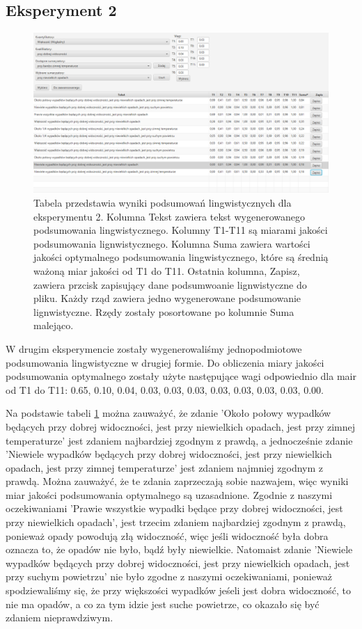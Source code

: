 \documentclass{classrep}
\begin{document}
\newpage
\subsection{Eksperyment 2}
\label{section:ex2}
\begin{figure}[h!]
 \centering
 \includegraphics[width=15cm]{ex2.png}
 \vspace{-0.3cm}
 \caption{Tabela przedstawia wyniki podsumowań lingwistycznych dla eksperymentu 2. Kolumna Tekst zawiera tekst wygenerowanego podsumowania lingwistycznego. Kolumny T1-T11 są miarami jakości podsumowania lignwistycznego\cite{niewiadomski19}. Kolumna Suma zawiera wartości jakości optymalnego podsumowania lingwistycznego, które są średnią ważoną miar jakości od T1 do T11. Ostatnia kolumna, Zapisz, zawiera przcisk zapisujący dane podsumwoanie lignwistyczne do pliku. Każdy rząd zawiera jedno wygenerowane podsumowanie lignwistyczne. Rzędy zostały posortowane po kolumnie Suma malejąco.  }
 \label{ex2}
\end{figure}

W drugim eksperymencie zostały wygenerowaliśmy jednopodmiotowe podsumowania lingwistyczne w drugiej formie. Do obliczenia miary jakości podsumowania optymalnego zostały użyte następujące wagi odpowiednio dla mair od T1 do T11: 0.65, 0.10, 0.04, 0.03, 0.03, 0.03, 0.03, 0.03, 0.03, 0.03, 0.00. 

Na podstawie tabeli \ref{ex2} można zauważyć, że zdanie 'Około połowy wypadków będących przy  dobrej widoczności, jest przy niewielkich opadach, jest przy zimnej temperaturze' jest zdaniem najbardziej zgodnym z prawdą, a jednocześnie zdanie 'Niewiele wypadków będących przy  dobrej widoczności, jest przy niewielkich opadach, jest przy zimnej temperaturze' jest zdaniem najmniej zgodnym z prawdą. Można zauważyć, że te zdania zaprzeczają sobie nazwajem, więc wyniki miar jakości podsumowania optymalnego są uzasadnione. Zgodnie z naszymi oczekiwaniami 'Prawie wszystkie wypadki będące przy dobrej widoczności, jest przy niewielkich opadach', jest trzecim zdaniem najbardziej zgodnym z prawdą, ponieważ opady powodują złą widoczność, więc jeśli widoczność była dobra oznacza to, że opadów nie było, bądź były niewielkie. Natomaist zdanie 'Niewiele wypadków będących przy dobrej widoczności, jest przy niewielkich opadach, jest przy suchym powietrzu' nie było zgodne z naszymi oczekiwaniami, ponieważ spodziewaliśmy się, że przy większości wypadków jeśeli jest dobra widoczność, to nie ma opadów, a co za tym idzie jest suche powietrze, co okazało się być zdaniem nieprawdziwym. 
\end{document}
